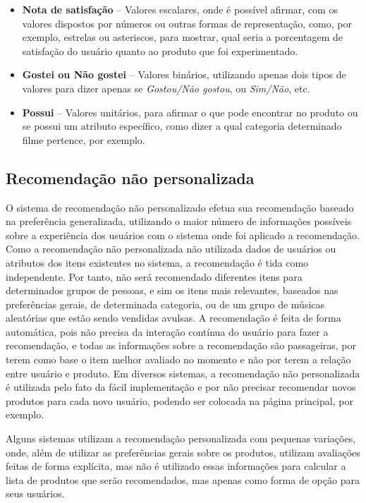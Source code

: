 \documentclass[12pt,
				openright,
				twoside,
				a4paper,
				apter=TITLE,
				section=TITLE,
				subsection=TITLE,
				chapter=TITLE,
				english,
				brazil]{abntex2}
\begin{document}
\begin{itemize}
\item \textbf{Nota de satisfação} – Valores escalares, onde é possível afirmar, com os valores dispostos por números ou outras formas de representação, como, por exemplo, estrelas ou asteriscos, para mostrar, qual seria a porcentagem de satisfação do usuário quanto ao produto que foi experimentado.
\item \textbf{Gostei ou Não gostei} – Valores binários, utilizando apenas dois tipos de valores para dizer apenas se \textit{Gostou/Não gostou}, ou \textit{Sim/Não}, etc.
\item \textbf{Possui} – Valores unitários, para afirmar o que pode encontrar no produto ou se possui um atributo específico, como dizer a qual categoria determinado filme pertence, por exemplo.
\end{itemize}



\subsection{Recomendação não personalizada}
O sistema de recomendação não personalizado\cite{schafer1999recommender} efetua sua recomendação baseado na preferência generalizada, utilizando o maior número de informações possíveis sobre a experiência dos usuários com o sistema onde foi aplicado a recomendação. Como a recomendação não personalizada não utilizada dados de usuários ou atributos dos itens existentes no sistema, a recomendação é tida como independente. Por tanto, não será recomendado diferentes itens para determinados grupos de pessoas, e sim os itens mais relevantes, baseados nas preferências gerais, de determinada categoria, ou de um grupo de músicas aleatórias que estão sendo vendidas avulsas. A recomendação é feita de forma automática, pois não precisa da interação contínua do usuário para fazer a recomendação, e todas as informações sobre a recomendação são passageiras, por terem como base o item melhor avaliado no momento e não por terem a relação entre usuário e produto. Em diversos sistemas, a recomendação não personalizada é utilizada pelo fato da fácil implementação e por não precisar recomendar novos produtos para cada novo usuário, podendo ser colocada na página principal, por exemplo.

Alguns sistemas utilizam a recomendação personalizada com pequenas variações, onde, além de utilizar as preferências gerais sobre os produtos, utilizam avaliações feitas de forma explícita, mas não é utilizado essas informações para calcular a lista de produtos que serão recomendados, mas apenas como forma de opção para seus usuários.
\end{document}
